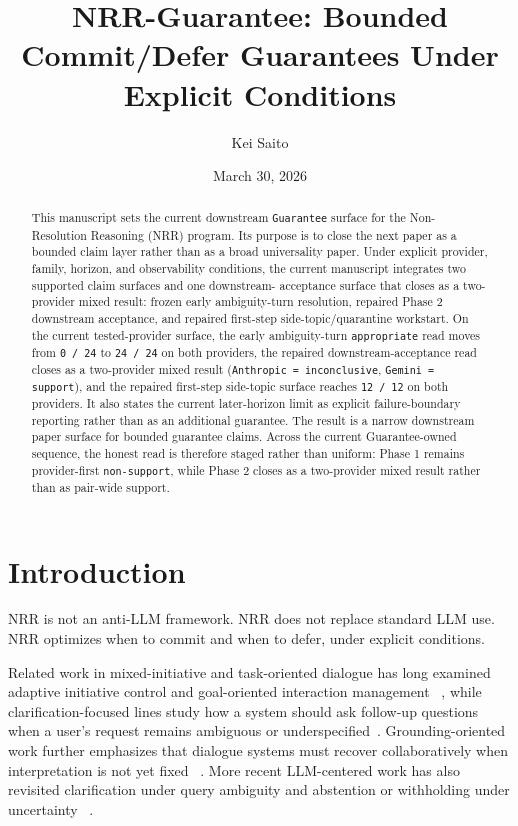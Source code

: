 \documentclass[11pt]{article}
\title{NRR-Guarantee: Bounded Commit/Defer Guarantees Under Explicit Conditions}
\author{Kei Saito}
\date{March 30, 2026}
\begin{document}
\maketitle

\begin{abstract}
This manuscript sets the current downstream \texttt{Guarantee} surface for the
Non-Resolution Reasoning (NRR) program. Its purpose is to close the next paper
as a bounded claim layer rather than as a broad universality paper. Under
explicit provider, family, horizon, and observability conditions, the current
manuscript integrates two supported claim surfaces and one downstream-
acceptance surface that closes as a two-provider mixed result: frozen early
ambiguity-turn resolution, repaired Phase 2 downstream acceptance, and repaired
first-step side-topic/quarantine workstart. On the current tested-provider
surface, the early ambiguity-turn \texttt{appropriate} read moves from
\texttt{0 / 24} to \texttt{24 / 24} on both providers, the repaired
downstream-acceptance read closes as a two-provider mixed result
(\texttt{Anthropic = inconclusive}, \texttt{Gemini = support}), and the
repaired first-step side-topic surface reaches \texttt{12 / 12} on both
providers. It also states the current later-horizon limit as explicit
failure-boundary reporting rather than as an additional guarantee. The result
is a narrow downstream paper surface for bounded guarantee claims. Across the
current Guarantee-owned sequence, the honest read is therefore staged rather
than uniform: Phase 1 remains provider-first \texttt{non-support}, while
Phase 2 closes as a two-provider mixed result rather than as pair-wide
support.
\end{abstract}

\section{Introduction}

NRR is not an anti-LLM framework. NRR does not replace standard LLM use. NRR
optimizes when to commit and when to defer, under explicit conditions.

Related work in mixed-initiative and task-oriented dialogue has long examined
adaptive initiative control and goal-oriented interaction management
~\cite{chucarroll2000mimic,saito2017taskdialogue}, while clarification-focused lines
study how a system should ask follow-up questions when a user's request remains
ambiguous or underspecified~\cite{deboni2003clarification,rao2018evpi,hu2020interactive}. Grounding-oriented work further emphasizes that dialogue systems
must recover collaboratively when interpretation is not yet fixed
~\cite{benotti2021groundedclarifications,benotti2021grounding}. More recent
LLM-centered work has also revisited clarification under query ambiguity and
abstention or withholding under uncertainty
~\cite{sahay-etal-2025-ask,wen-etal-2025-know,madhusudhan-etal-2025-llms}.
\end{document}
